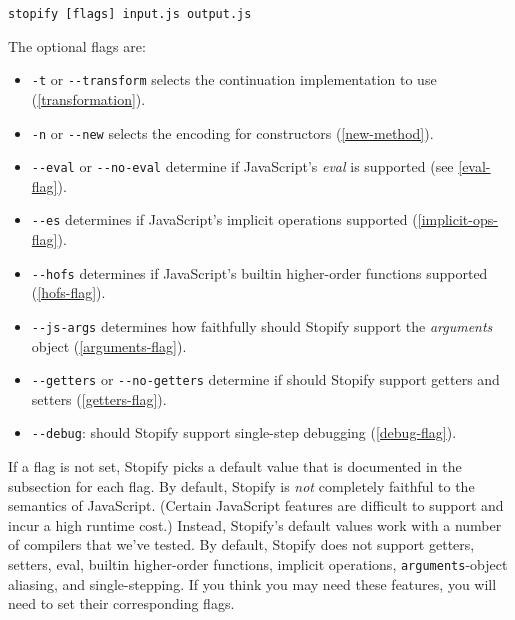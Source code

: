 \documentclass[10pt]{book}
\begin{document}
\begin{lstlisting}
stopify [flags] input.js output.js
\end{lstlisting}

The optional flags are:
\begin{itemize}

  \item \lstinline|-t| or \lstinline|--transform| selects the continuation implementation
  to use (\cref{transformation}).

  \item \lstinline|-n| or \lstinline|--new| selects the encoding for constructors (\cref{new-method}).

  \item \lstinline|--eval| or \lstinline|--no-eval| determine if JavaScript's \emph{eval} is supported
  (see \cref{eval-flag}).

  \item \lstinline|--es| determines if JavaScript's implicit operations supported (\cref{implicit-ops-flag}).

  \item \lstinline|--hofs| determines if JavaScript's builtin higher-order functions supported (\cref{hofs-flag}).

  \item \lstinline|--js-args| determines how faithfully should Stopify support the \emph{arguments} object (\cref{arguments-flag}).

  \item \lstinline|--getters| or \lstinline|--no-getters| determine if should Stopify support getters and setters (\cref{getters-flag}).

  \item \lstinline|--debug|: should Stopify support single-step debugging (\cref{debug-flag}).
\end{itemize}

If a flag is not set, Stopify picks a default value that is documented
in the subsection for each flag. By default, Stopify is \emph{not} completely
faithful to the semantics of JavaScript. (Certain JavaScript features are
difficult to support and incur a high runtime cost.) Instead, Stopify's default
values work with a number of compilers that we've tested. By default,
Stopify does not support getters, setters, eval, builtin higher-order
functions, implicit operations, \lstinline|arguments|-object aliasing,
and single-stepping.
If you think you may need these features, you will
need to set their corresponding flags.
\end{document}
